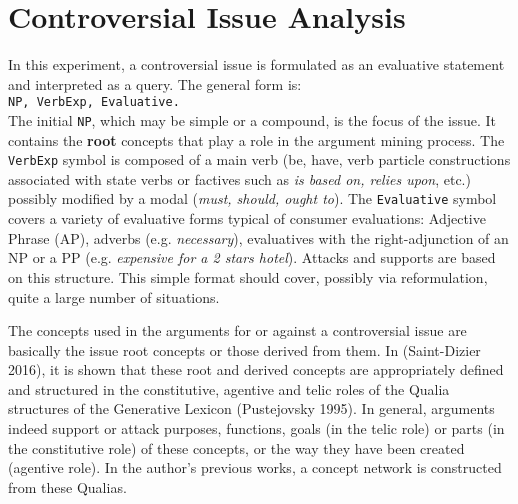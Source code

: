\documentclass[11pt,letterpaper]{article}
\begin{document}
\section{Controversial Issue  Analysis}

In this experiment, a controversial issue is formulated as an evaluative statement and interpreted as a query.
The general form  is:\\
{\tt NP, VerbExp, Evaluative.} \\
The initial {\tt NP}, which may be simple or a compound, is the focus of the issue. It contains the {\bf  root} concepts that play a role in the argument mining process.
The {\tt VerbExp} symbol is composed of a main verb (be, have, verb particle constructions associated with state verbs or factives such as {\it is based on, relies upon}, etc.) possibly modified by a modal ({\it must, should, ought to}).
The {\tt Evaluative} symbol covers a variety of evaluative forms typical of consumer evaluations: Adjective Phrase (AP), adverbs (e.g. {\it necessary}), evaluatives with the right-adjunction of an NP or a PP (e.g. {\it expensive for a 2 stars hotel}). Attacks and supports are based on this structure. 
 This simple format should cover, possibly via reformulation, quite a large number of  situations.

The concepts  used in the arguments for or against a controversial issue are basically 
 the issue root concepts or those derived from them. 
In (Saint-Dizier 2016), it is shown that these root and derived concepts are appropriately defined and structured in
the constitutive, agentive and telic roles of the Qualia structures of the Generative Lexicon (Pustejovsky 1995).  
In general, arguments indeed support or attack purposes, functions, goals (in the telic role) or parts (in the constitutive role) of these concepts, or the way they have been created (agentive role). In the author's previous works, a concept network is constructed from these Qualias. %
\end{document}
